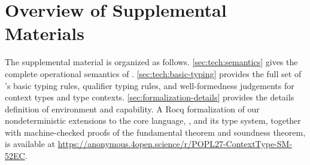 \section{Overview of Supplemental Materials}

The supplemental material is organized as follows.
\autoref{sec:tech:semantics} gives the complete operational semantics
of \langname{}.  \autoref{sec:tech:basic-typing} provides the full set
of \langname{}'s basic typing rules, qualifier typing rules, and
well-formedness judgements for context types and type contexts.
\autoref{sec:formalization-details} provides the details definition of
environment and capability.  A Rocq formalization of our
nondeterministic extensions to the core language, \langNDname{}, and
its type system, together with machine-checked proofs of the
fundamental theorem and soundness theorem, is available at
\url{https://anonymous.4open.science/r/POPL27-ContextType-SM-52EC}.
